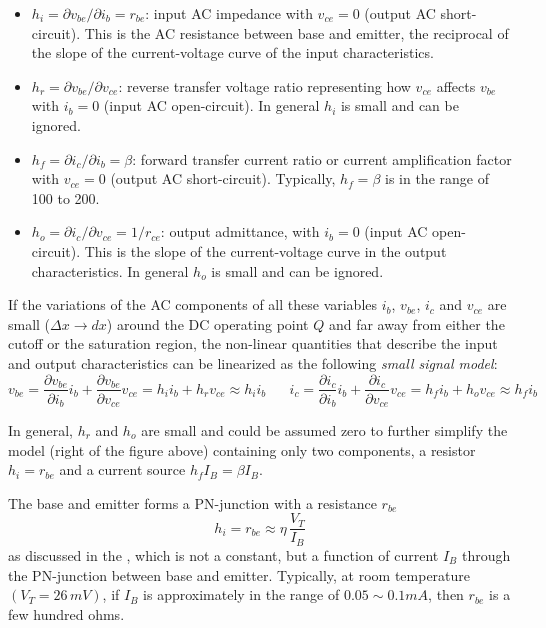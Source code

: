 \documentclass{article}
\begin{document}
\begin{itemize}
\item $h_i=\partial v_{be}/\partial i_b=r_{be}$: input AC impedance
  with $v_{ce}=0$ (output AC short-circuit). This is the AC 
  resistance between base and emitter, the reciprocal of the 
  slope of the current-voltage curve of the input characteristics. 

\item $h_r=\partial v_{be}/\partial v_{ce}$: reverse transfer voltage
  ratio representing how $v_{ce}$ affects $v_{be}$ with $i_b=0$ (input 
  AC open-circuit). In general $h_i$ is small and can be ignored.

\item $h_f=\partial i_c/\partial i_b=\beta$: forward transfer current 
    ratio or current amplification factor with $v_{ce}=0$ (output AC
    short-circuit). Typically, $h_f=\beta$ is in the range of 100 to 
    200.

\item $h_o=\partial i_c/\partial v_{ce}=1/r_{ce}$: output admittance,
  with $i_b=0$ (input AC open-circuit). This is the slope of the 
  current-voltage curve in the output characteristics. In general 
  $h_o$ is small and can be ignored.
\end{itemize}
If the variations of the AC components of all these variables 
$i_b$, $v_{be}$, $i_c$ and $v_{ce}$ are small ($\Delta x\rightarrow dx$)
around the DC operating point $Q$ and far away from either the cutoff
or the saturation region, the non-linear quantities that describe the
input and output characteristics can be linearized as the following
{\em small signal model}:
\begin{equation}
v_{be}=\frac{\partial v_{be}}{\partial i_b}
i_b+\frac{\partial v_{be}}{\partial v_{ce}} v_{ce}=h_i i_b+h_r v_{ce}	
\approx h_i i_b
\;\;\;\;\;\;
i_c=\frac{\partial i_c}{\partial i_b} i_b
+\frac{\partial i_c}{\partial v_{ce}} v_{ce}=h_f i_b+h_o v_{ce}
\approx h_f i_b
\end{equation}



In general, $h_r$ and $h_o$ are small and could be assumed zero to 
further simplify the model (right of the figure above) containing
only two components, a resistor $h_i=r_{be}$ and a current source 
$h_f I_B=\beta I_B$.

The base and emitter forms a PN-junction with a resistance $r_{be}$ 
\begin{equation}	
h_i=r_{be}\approx \eta\,\frac{V_T}{I_B}	
\end{equation}
as discussed in the 
, which is not a
constant, but a function of current $I_B$ through the PN-junction 
between base and emitter. Typically, at room temperature $(V_T=26\,mV)$, 
if $I_B$ is approximately in the range of $0.05\sim 0.1 mA$, then 
$r_{be}$ is a few hundred ohms. 
\end{document}
